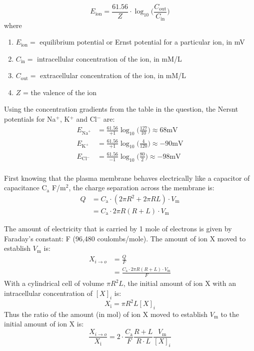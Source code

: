 \documentclass[12pt,twoside]{article}
\begin{document}
$$
	E_{\text{ion}} = \frac{61.56}{Z} \cdot \log_{10} \bigg( \frac{C_{\text{out}}} {C_{\text{in}}} \bigg)
$$
where 
\begin{enumerate}[] 
\item $E_{\text{ion}} =$ equilibrium potential or Ernst potential for a particular ion, in mV
\item $C_{\text{in}} =$ intracellular concentration of the ion, in mM/L
\item $C_{\text{out}} =$ extracellular concentration of the ion, in mM/L
\item $Z$ = the valence of the ion
\end{enumerate}
 Using the concentration gradients from the table in the question, the Nersnt potentials for Na$^+$, K$^+$ and Cl$^-$  are:
 \begin{align*}
 	E_{\text{Na}^+}	&= \frac{61.56}{+1} \log_{10} \bigg( \frac{127} {10} \bigg) \approx 68 \text{mV} \\
 	E_{\text{K}^+}	&= \frac{61.56}{+1} \log_{10} \bigg( \frac{4} {120} \bigg) \approx -90 \text{mV} \\
 	E_{\text{Cl}^-}	&= \frac{61.56}{-1} \log_{10} \bigg( \frac{80} {2} \bigg) \approx -98 \text{mV} \\
 \end{align*}

First knowing that the plasma membrane behaves electrically like a capacitor of capacitance C$_\text{a}$ F/m$^2$, the charge separation across the
membrane is:
 \begin{align*}
 	Q &= C_\text{a} \cdot (2 \pi R^2 + 2 \pi R L) \cdot V_{\text{m}}\\
	    &= C_\text{a} \cdot 2 \pi R (R + L)  \cdot V_{\text{m}}
 \end{align*}
 
 The amount of electricity that is carried by 1 mole of electrons is given by Faraday's constant: F (96,480 coulombs/mole).
 The amount of ion X moved to establish $V_{\text{m}}$ is: 
 \begin{align*}
 X_{i \rightarrow o} 	&= \frac{Q}{F} \\
 				&= \frac{C_\text{a} \cdot 2 \pi R (R + L)  \cdot V_{\text{m}}} {F}
 \end{align*}
 With a cylindrical cell of volume $\pi R^2 L$, the initial amount of ion X with an intracellular concentration of $[X]_{i}$ is:
 $$X_{\text{i}} = \pi R^2 L [X]_{i}$$
 Thus the ratio of the amount (in mol) of ion X moved to establish $V_{\text{m}}$ to the initial amount of ion X is:
 $$\frac{X_{i \rightarrow o} } {X_{\text{i}}} = 2 \cdot \frac{C_\text{a}} {F} \frac{R+L} {R \cdot L} \frac{V_{\text{m}}} {[X]_{i}}$$
 
\end{document}
